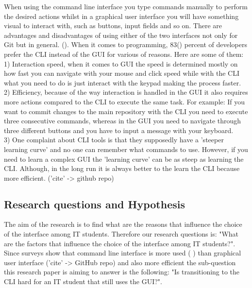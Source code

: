 \documentclass[]{report}
\begin{document}
	When using the command line interface you type commands manually to perform the desired actions whilst in a graphical user interface you will have something visual to interact with, such as buttons, input fields and so on. There are advantages and disadvantages of using either of the two interfaces not only for Git but in general. (\cite{hultstrand_git_2015}). When it comes to programming, 83(\cite{noauthor_stack_nodate}) percent of developers prefer the CLI instead of the GUI for various of reasons. Here are some of them: \\1) Interaction speed, when it comes to GUI the speed is determined mostly on how fast you can navigate with your mouse and click speed while with the CLI what you need to do is just interact with the keypad making the process faster. \\2) Efficiency, because of the way interaction is handled in the GUI it also requires more actions compared to the CLI to execute the same task. For example: If you want to commit changes to the main repository with the CLI you need to execute three consecutive commands, whereas in the GUI you need to navigate through three different buttons and you have to input a message with your keyboard. \\3) One complaint about CLI tools is that they supposedly have a 'steeper learning curve' and no one can remember what commands to use. However, if you need to learn a complex GUI the 'learning curve' can be as steep as learning the CLI. Although, in the long run it is always better to the learn the CLI because more efficient. ('cite' -> github repo)

	\subsection{Research questions and Hypothesis}
	The aim of the research is to find what are the reasons that influence the choice of the interface among IT students. Therefore our research questions is: "What are the factors that influence the choice of the interface among IT students?". Since surveys show that command line interface is more used (\cite{noauthor_stack_nodate} ) than graphical user interface ('cite' -> GitHub repo) and also more efficient the sub-question this research paper is aiming to answer is the following: "Is transitioning to the CLI hard for an IT student that still uses the GUI?".
	
\end{document}
